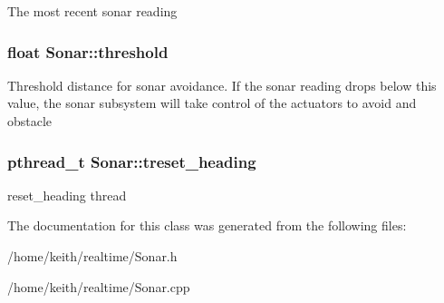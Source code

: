The most recent sonar reading \hypertarget{classSonar_a9896ea663ac5b8c327fed879fdc6110f}{
\subsubsection[{threshold}]{\setlength{\rightskip}{0pt plus 5cm}float Sonar\-::threshold\hspace{0.3cm}{\ttfamily [protected]}}}\label{classSonar_a9896ea663ac5b8c327fed879fdc6110f}
Threshold distance for sonar avoidance. If the sonar reading drops below this value, the sonar subsystem will take control of the actuators to avoid and obstacle \hypertarget{classSonar_af3ec5683614e9f1755e54da32184412a}{
\subsubsection[{treset\-\_\-heading}]{\setlength{\rightskip}{0pt plus 5cm}pthread\-\_\-t Sonar\-::treset\-\_\-heading\hspace{0.3cm}{\ttfamily [protected]}}}\label{classSonar_af3ec5683614e9f1755e54da32184412a}
reset\-\_\-heading thread 

The documentation for this class was generated from the following files\-:\begin{DoxyCompactItemize}
\item 
/home/keith/realtime/Sonar.\-h\item 
/home/keith/realtime/Sonar.\-cpp\end{DoxyCompactItemize}
